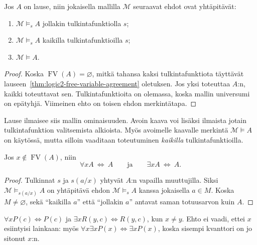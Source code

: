 \documentclass[11pt,a4paper]{amsart}
\begin{document}
\begin{corollary}
  Jos $A$ on lause, niin jokaisella mallilla $\mathcal M$ seuraavat
  ehdot ovat yhtäpitävät:
  \begin{enumerate}[label=(\roman*)]
    \item $\mathcal M\models_s A$ jollakin tulkintafunktiolla $s$;
    \item $\mathcal M\models_s A$ kaikilla tulkintafunktioilla $s$;
    \item $\mathcal M\models A$.
  \end{enumerate}
\end{corollary}

\begin{proof}
  Koska $\operatorname{FV}(A)=\varnothing$, mitkä tahansa kaksi
  tulkintafunktiota täyttävät lauseen~\ref{thm:logic2-free-variable-agreement}
  oletuksen. Jos yksi toteuttaa $A$:n, kaikki toteuttavat sen.
  Tulkintafunktioita on olemassa, koska mallin universumi on epätyhjä.
  Viimeinen ehto on toisen ehdon merkintätapa.
\end{proof}

Lause ilmaisee siis mallin ominaisuuden. Avoin kaava voi lisäksi
ilmaista jotain tulkintafunktion valitsemista alkioista. Myös avoimelle
kaavalle merkintä $\mathcal M\models A$ on käytössä, mutta silloin
vaaditaan toteutuminen \emph{kaikilla} tulkintafunktioilla.

\begin{corollary}
  Jos $x\notin\operatorname{FV}(A)$, niin
  \[
    \forall xA\ \Leftrightarrow\ A
    \qquad\text{ja}\qquad
    \exists xA\ \Leftrightarrow\ A.
  \]
\end{corollary}

\begin{proof}
  Tulkinnat $s$ ja $s(a/x)$ yhtyvät $A$:n vapailla muuttujilla.
  Siksi $\mathcal M\models_{s(a/x)}A$ on yhtäpitävä ehdon
  $\mathcal M\models_s A$ kanssa jokaisella $a\in M$.
  Koska $M\ne\varnothing$, sekä ``kaikilla $a$'' että ``jollakin $a$''
  antavat saman totuusarvon kuin $A$.
\end{proof}

\begin{example}
  $\forall xP(c)\Leftrightarrow P(c)$ ja
  $\exists xR(y,c)\Leftrightarrow R(y,c)$, kun $x\ne y$.
  Ehto ei vaadi, ettei $x$ esiintyisi lainkaan: myös
  $\forall x\exists xP(x)\Leftrightarrow\exists xP(x)$,
  koska sisempi kvanttori on jo sitonut $x$:n.
\end{example}
\end{document}
